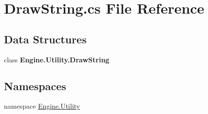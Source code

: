 \hypertarget{a00227}{}\section{Draw\+String.\+cs File Reference}
\label{a00227}
\subsection*{Data Structures}
\begin{DoxyCompactItemize}
\item 
class {\bfseries Engine.\+Utility.\+Draw\+String}
\end{DoxyCompactItemize}
\subsection*{Namespaces}
\begin{DoxyCompactItemize}
\item 
namespace \hyperlink{a00282}{Engine.\+Utility}
\end{DoxyCompactItemize}
